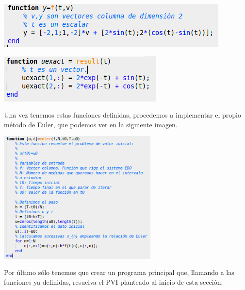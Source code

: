 \begin{center}
    \begin{minipage}{0.55\textwidth}
        \centering
        \includegraphics[width=\textwidth]{img/f.png}
    \end{minipage}
    \begin{minipage}{.4\textwidth}
        \centering
        \includegraphics[width=\textwidth]{img/result.png}
    \end{minipage}
\end{center}

Una vez tenemos estas funciones definidas, procedemos a implementar el propio método de Euler, que podemos ver en la siguiente imagen.

\begin{center}
\includegraphics[width=0.6\textwidth]{img/euler.png}
\end{center}

Por último sólo tenemos que crear un programa principal que, llamando a las funciones ya definidas, resuelva el PVI planteado al inicio de esta sección.

